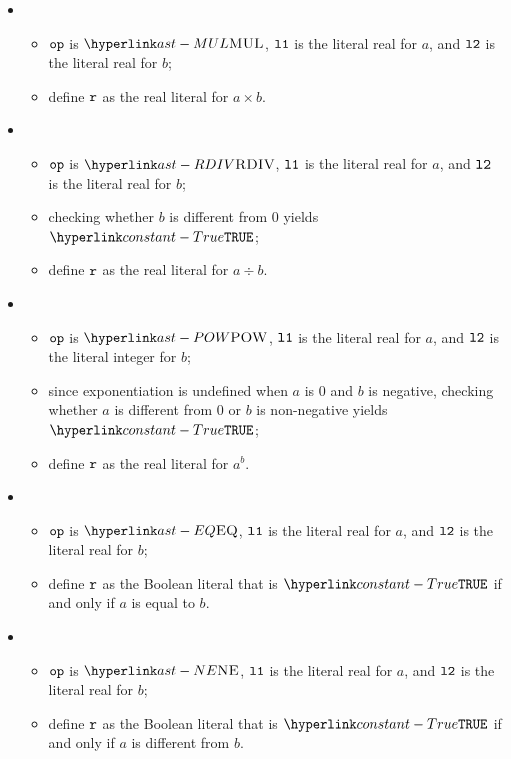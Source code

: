 \begin{itemize}
  \item {}
  \begin{itemize}
    \item $\texttt{op}$ is $\MUL$, $\texttt{l1}$ is the literal real for $a$, and $\texttt{l2}$ is the literal real for $b$;
    \item define $\texttt{r}$ as the real literal for $a \times b$.
  \end{itemize}

  \item {}
  \begin{itemize}
    \item $\texttt{op}$ is $\RDIV$, $\texttt{l1}$ is the literal real for $a$, and $\texttt{l2}$ is the literal real for $b$;
    \item checking whether $b$ is different from $0$ yields $\True$\ProseOrTypeError;
    \item define $\texttt{r}$ as the real literal for $a \div b$.
  \end{itemize}

  \item {}
  \begin{itemize}
    \item $\texttt{op}$ is $\POW$, $\texttt{l1}$ is the literal real for $a$, and $\texttt{l2}$ is the literal integer for $b$;
    \item since exponentiation is undefined when $a$ is 0 and $b$ is negative,
          checking whether $a$ is different from $0$ or $b$ is non-negative yields $\True$\ProseOrTypeError;
    \item define $\texttt{r}$ as the real literal for $a^b$.
  \end{itemize}

  \item {}
  \begin{itemize}
    \item $\texttt{op}$ is $\EQ$, $\texttt{l1}$ is the literal real for $a$, and $\texttt{l2}$ is the literal real for $b$;
    \item define $\texttt{r}$ as the Boolean literal that is $\True$ if and only if $a$ is equal to $b$.
  \end{itemize}

  \item {}
  \begin{itemize}
    \item $\texttt{op}$ is $\NE$, $\texttt{l1}$ is the literal real for $a$, and $\texttt{l2}$ is the literal real for $b$;
    \item define $\texttt{r}$ as the Boolean literal that is $\True$ if and only if $a$ is different from $b$.
  \end{itemize}


\end{itemize}

